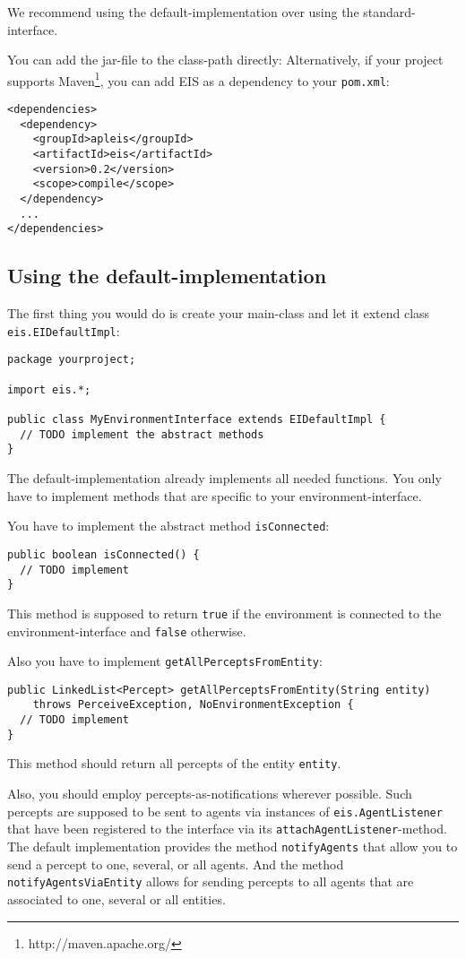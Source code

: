 \documentclass[a4]{article}
\newcommand{\EIS}{\textsf{EIS}\xspace}
\begin{document}
We recommend using the default-implementation over using the standard-interface.

You can add the jar-file to the class-path directly:
Alternatively, if your project supports  
Maven\footnote{http://maven.apache.org/}, you can add \EIS as a dependency to your \texttt{pom.xml}:
\begin{verbatim}
<dependencies>
  <dependency>
    <groupId>apleis</groupId> 
    <artifactId>eis</artifactId> 
    <version>0.2</version> 
    <scope>compile</scope>
  </dependency>
  ...
</dependencies>
\end{verbatim}


\subsection{Using the default-implementation}

The first thing you would do is create your main-class and let it extend class \texttt{eis.EIDefaultImpl}:
\begin{verbatim}
package yourproject;

import eis.*;

public class MyEnvironmentInterface extends EIDefaultImpl {
  // TODO implement the abstract methods
}
\end{verbatim}
The default-implementation already implements all needed functions. 
You only have to implement methods that are specific to your environment-interface. 

You have to implement the abstract method \texttt{isConnected}:
\begin{verbatim}
public boolean isConnected() {
  // TODO implement
}
\end{verbatim}
This method is supposed to return \texttt{true} if the environment is connected to the environment-interface and \texttt{false}
otherwise. 

Also you have to implement \texttt{getAllPerceptsFromEntity}:
\begin{verbatim}
public LinkedList<Percept> getAllPerceptsFromEntity(String entity) 
    throws PerceiveException, NoEnvironmentException {
  // TODO implement
}
\end{verbatim}
This method should return all percepts of the entity \texttt{entity}.

Also, you should employ percepts-as-notifications wherever possible. Such percepts are supposed to be sent to
agents via instances of \texttt{eis.AgentListener} that have been registered to the interface via its \texttt{attachAgentListener}-method. The default implementation provides the method \texttt{notifyAgents} that allow you 
to send a percept to one, several, or all agents. And the method \texttt{notifyAgentsViaEntity} allows for sending
percepts to all agents that are associated to one, several or all entities.
\end{document}
